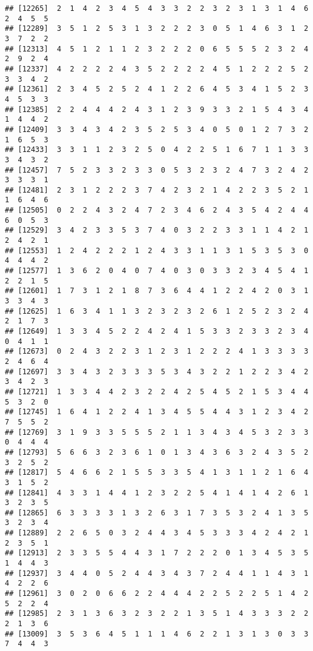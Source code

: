 \documentclass[
]{article}
\begin{document}
\begin{verbatim}
## [12265]  2  1  4  2  3  4  5  4  3  3  2  2  3  2  3  1  3  1  4  6  2  4  5  5
## [12289]  3  5  1  2  5  3  1  3  2  2  2  3  0  5  1  4  6  3  1  2  3  7  2  2
## [12313]  4  5  1  2  1  1  2  3  2  2  2  0  6  5  5  5  2  3  2  4  2  9  2  4
## [12337]  4  2  2  2  2  4  3  5  2  2  2  2  4  5  1  2  2  2  5  2  3  3  4  2
## [12361]  2  3  4  5  2  5  2  4  1  2  2  6  4  5  3  4  1  5  2  3  4  5  3  3
## [12385]  2  2  4  4  4  2  4  3  1  2  3  9  3  3  2  1  5  4  3  4  1  4  4  2
## [12409]  3  3  4  3  4  2  3  5  2  5  3  4  0  5  0  1  2  7  3  2  1  6  5  3
## [12433]  3  3  1  1  2  3  2  5  0  4  2  2  5  1  6  7  1  1  3  3  3  4  3  2
## [12457]  7  5  2  3  3  2  3  3  0  5  3  2  3  2  4  7  3  2  4  2  3  3  3  1
## [12481]  2  3  1  2  2  2  3  7  4  2  3  2  1  4  2  2  3  5  2  1  1  6  4  6
## [12505]  0  2  2  4  3  2  4  7  2  3  4  6  2  4  3  5  4  2  4  4  6  0  5  3
## [12529]  3  4  2  3  3  5  3  7  4  0  3  2  2  3  3  1  1  4  2  1  2  4  2  1
## [12553]  1  2  4  2  2  2  1  2  4  3  3  1  1  3  1  5  3  5  3  0  4  4  4  2
## [12577]  1  3  6  2  0  4  0  7  4  0  3  0  3  3  2  3  4  5  4  1  2  2  1  5
## [12601]  1  7  3  1  2  1  8  7  3  6  4  4  1  2  2  4  2  0  3  1  3  3  4  3
## [12625]  1  6  3  4  1  1  3  2  3  2  3  2  6  1  2  5  2  3  2  4  2  1  7  3
## [12649]  1  3  3  4  5  2  2  4  2  4  1  5  3  3  2  3  3  2  3  4  0  4  1  1
## [12673]  0  2  4  3  2  2  3  1  2  3  1  2  2  2  4  1  3  3  3  3  2  4  6  4
## [12697]  3  3  4  3  2  3  3  3  5  3  4  3  2  2  1  2  2  3  4  2  3  4  2  3
## [12721]  1  3  3  4  4  2  3  2  2  4  2  5  4  5  2  1  5  3  4  4  5  3  2  0
## [12745]  1  6  4  1  2  2  4  1  3  4  5  5  4  4  3  1  2  3  4  2  7  5  5  2
## [12769]  3  1  9  3  3  5  5  5  2  1  1  3  4  3  4  5  3  2  3  3  0  4  4  4
## [12793]  5  6  6  3  2  3  6  1  0  1  3  4  3  6  3  2  4  3  5  2  3  2  5  2
## [12817]  5  4  6  6  2  1  5  5  3  3  5  4  1  3  1  1  2  1  6  4  3  1  5  2
## [12841]  4  3  3  1  4  4  1  2  3  2  2  5  4  1  4  1  4  2  6  1  3  2  3  5
## [12865]  6  3  3  3  3  1  3  2  6  3  1  7  3  5  3  2  4  1  3  5  3  2  3  4
## [12889]  2  2  6  5  0  3  2  4  4  3  4  5  3  3  3  4  2  4  2  1  2  3  5  1
## [12913]  2  3  3  5  5  4  4  3  1  7  2  2  2  0  1  3  4  5  3  5  1  4  4  3
## [12937]  3  4  4  0  5  2  4  4  3  4  3  7  2  4  4  1  1  4  3  1  4  2  2  6
## [12961]  3  0  2  0  6  6  2  2  4  4  4  2  2  5  2  2  5  1  4  2  5  2  2  4
## [12985]  2  3  1  3  6  3  2  3  2  2  1  3  5  1  4  3  3  3  2  2  2  1  3  6
## [13009]  3  5  3  6  4  5  1  1  1  4  6  2  2  1  3  1  3  0  3  3  7  4  4  3

\end{verbatim}
\end{document}
